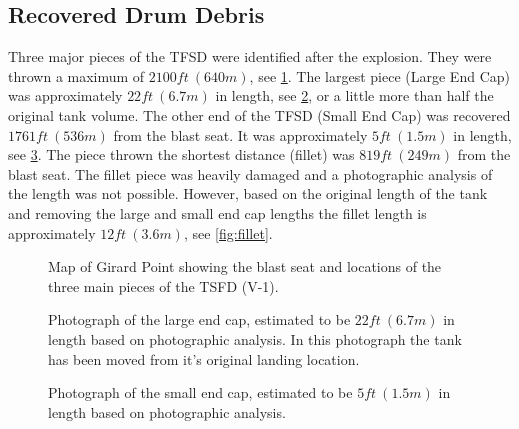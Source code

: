\documentclass[10pt,parskip=half,
toc=sectionentrywithdots,
bibliography=totocnumbered,
captions=tableheading,numbers=noendperiod]{scrartcl}
\begin{document}
\hypertarget{recovered-drum-debris}{%
\subsection{Recovered Drum Debris}\label{recovered-drum-debris}}

Three major pieces of the TFSD were identified after the explosion. They
were thrown a maximum of \(2100ft\:(640m)\), see
\cref{fig:blast_debris}. The largest piece (Large End Cap) was
approximately \(22ft\:(6.7m)\) in length, see \cref{fig:large_end_cap},
or a little more than half the original tank volume. The other end of
the TFSD (Small End Cap) was recovered \(1761ft\:(536m)\) from the blast
seat. It was approximately \(5ft\:(1.5m)\) in length, see
\cref{fig:small_end_cap}. The piece thrown the shortest distance
(fillet) was \(819ft\:(249m)\) from the blast seat. The fillet piece was
heavily damaged and a photographic analysis of the length was not
possible. However, based on the original length of the tank and removing
the large and small end cap lengths the fillet length is approximately
\(12ft\:(3.6m)\), see \cref{fig:fillet}.

\begin{figure}[H]
\hypertarget{fig:blast_debris}{%
\begin{center}
\end{center}
\caption{Map of Girard Point showing the blast seat and locations of the three
main pieces of the TSFD (V-1).\cite{Malone2019a}}\label{fig:blast_debris}
}
\end{figure}

\begin{figure}[H]
\hypertarget{fig:large_end_cap}{%
\begin{center}
\end{center}
\caption{Photograph of the large end cap, estimated to be \(22ft\:(6.7m)\) in
length based on photographic analysis. In this photograph the tank has
been moved from it's original landing location.\cite{Malone2019a}}\label{fig:large_end_cap}
}
\end{figure}

\begin{figure}[H]
\hypertarget{fig:small_end_cap}{%
\begin{center}
\end{center}
\caption{Photograph of the small end cap, estimated to be \(5ft\:(1.5m)\) in
length based on photographic analysis.\cite{Malone2019a}}\label{fig:small_end_cap}
}
\end{figure}
\end{document}
